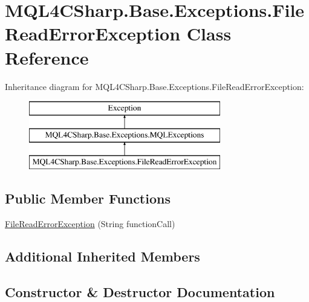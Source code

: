 \hypertarget{class_m_q_l4_c_sharp_1_1_base_1_1_exceptions_1_1_file_read_error_exception}{}\section{M\+Q\+L4\+C\+Sharp.\+Base.\+Exceptions.\+File\+Read\+Error\+Exception Class Reference}
\label{class_m_q_l4_c_sharp_1_1_base_1_1_exceptions_1_1_file_read_error_exception}
Inheritance diagram for M\+Q\+L4\+C\+Sharp.\+Base.\+Exceptions.\+File\+Read\+Error\+Exception\+:\begin{figure}[H]
\begin{center}
\leavevmode
\includegraphics[height=3.000000cm]{class_m_q_l4_c_sharp_1_1_base_1_1_exceptions_1_1_file_read_error_exception}
\end{center}
\end{figure}
\subsection*{Public Member Functions}
\begin{DoxyCompactItemize}
\item 
\hyperlink{class_m_q_l4_c_sharp_1_1_base_1_1_exceptions_1_1_file_read_error_exception_a2b51921e1cac8e56bc9df53d4b20caf0}{File\+Read\+Error\+Exception} (String function\+Call)
\end{DoxyCompactItemize}
\subsection*{Additional Inherited Members}


\subsection{Constructor \& Destructor Documentation}
